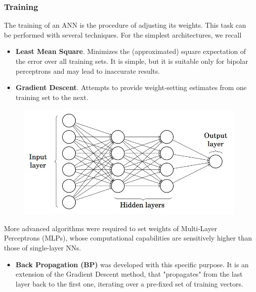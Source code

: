 \documentclass{beamer}
\begin{document}
\begin{frame}
\frametitle{Training}
The training of an ANN is the procedure of adjusting its weights. This task can be performed with several techniques. For the simplest architectures, we recall
\begin{itemize}
\item \textbf{Least Mean Square}. Minimizes the (approximated) square expectation of the error over all training sets. It is simple, but it is suitable only for bipolar perceptrons and may lead to inaccurate results.
\item \textbf{Gradient Descent}. Attempts to provide weight-setting estimates from one training set to the next.
\end{itemize}
\end{frame}

\begin{frame}
\begin{figure}
\includegraphics[height = 0.4\textheight]{"pictures/multilayer-perceptron.png"}
\end{figure}
More advanced algorithms were required to set weights of Multi-Layer Perceptrons (MLPs), whose computational capabilities are sensitively higher than those of single-layer NNs. 
\begin{itemize}
\item \textbf{Back Propagation (BP)} was developed with this specific purpose. It is an extension of the Gradient Descent method, that "propagates" from the last layer back to the first one, iterating over a pre-fixed set of training vectors.
\end{itemize}
\end{frame}
\end{document}
